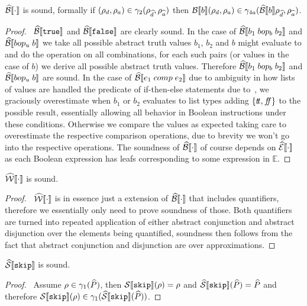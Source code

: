 \begin{conjecture}\label{thm:sound-bool}
    $\widehat{\mathcal{B}}\llbracket \cdot \rrbracket$ is sound, formally if $(\rho_d, \rho_a) \in \gamma_2(\rho_{\widehat{d}}, \rho_{\widehat{a}})$ then $\mathcal{B}\llbracket b \rrbracket(\rho_d, \rho_a) \in \gamma_{4a}(\widehat{\mathcal{B}}\llbracket b \rrbracket\rho_{\widehat{d}}, \rho_{\widehat{a}})$.
\end{conjecture}
\begin{proof}
    \pfsketch\
    $\widehat{\mathcal{B}}\llbracket \texttt{true} \rrbracket$ and $\widehat{\mathcal{B}}\llbracket \texttt{false} \rrbracket$ are clearly sound.
    In the case of $\widehat{\mathcal{B}}\llbracket b_1 \; bop_b \; b_2 \rrbracket$ and $\widehat{\mathcal{B}}\llbracket bop_u \; b \rrbracket$ we take all possible abstract truth values $b_1$, $b_2$ and $b$ might evaluate to and do the operation on all combinations, for each such pairs (or values in the case of $b$) we derive all possible abstract truth values.
    Therefore $\widehat{\mathcal{B}}\llbracket b_1 \; bop_b \; b_2 \rrbracket$ and $\widehat{\mathcal{B}}\llbracket bop_u \; b \rrbracket$ are sound.
    In the case of $\widehat{\mathcal{B}}\llbracket e_1 \; comp \; e_2 \rrbracket$ due to ambiguity in how lists of values are handled the predicate of if-then-else statements due to~\cite{halder_abstract_2012}, we graciously overestimate when $b_1$ or $b_2$ evaluates to list types adding $\{t\!t, f\!\!f\}$ to the possible result, essentially allowing all behavior in Boolean instructions under these conditions.
    Otherwise we compare the values as expected taking care to overestimate the respective comparison operations, due to brevity we won't go into the respective operations.
    The soundness of $\widehat{\mathcal{B}}\llbracket \cdot \rrbracket$ of course depends on $\widehat{\mathcal{E}}\llbracket \cdot \rrbracket$ as each Boolean expression has leafs corresponding to some expression in $\mathbb{E}$.
\end{proof}

\begin{conjecture}\label{thm:sound-exp}
    $\widehat{\mathcal{W}}\llbracket \cdot \rrbracket$ is sound.
\end{conjecture}
\begin{proof}
    \pfsketch\
    $\widehat{\mathcal{W}}\llbracket \cdot \rrbracket$ is in essence just a extension of $\widehat{\mathcal{B}}\llbracket \cdot \rrbracket$ that includes quantifiers, therefore we essentially only need to prove soundness of those.
    Both quantifiers are turned into repeated application of either abstract conjunction and abstract disjunction over the elements being quantified, soundness then follows from the fact that abstract conjunction and disjunction are over approximations.
\end{proof}

\begin{conjecture}\label{thm:sound-skip}
    $\widehat{\mathcal{S}} \llbracket \texttt{skip} \rrbracket$ is sound.
\end{conjecture}
\begin{proof}
    \pf\ Assume $\rho \in \gamma_1(\widehat{P})$, then $\mathcal{S} \llbracket \texttt{skip} \rrbracket(\rho) = \rho$ and $\widehat{\mathcal{S}} \llbracket \texttt{skip} \rrbracket(\widehat{P}) = \widehat{P}$ and therefore $\mathcal{S} \llbracket \texttt{skip} \rrbracket(\rho) \in \gamma_1(\widehat{\mathcal{S}} \llbracket \texttt{skip} \rrbracket(\widehat{P}))$.
\end{proof}

